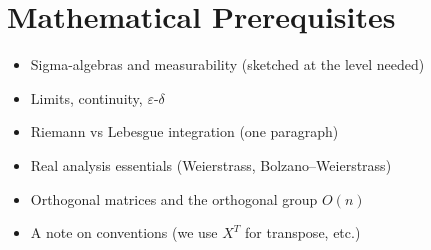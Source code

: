 \chapter{Mathematical Prerequisites}
\label{app:prereqs}


\begin{itemize}
  \item Sigma-algebras and measurability (sketched at the level needed)
  \item Limits, continuity, $\varepsilon$-$\delta$
  \item Riemann vs Lebesgue integration (one paragraph)
  \item Real analysis essentials (Weierstrass, Bolzano--Weierstrass)
  \item Orthogonal matrices and the orthogonal group $O(n)$
  \item A note on conventions (we use $X^T$ for transpose, etc.)
\end{itemize}

